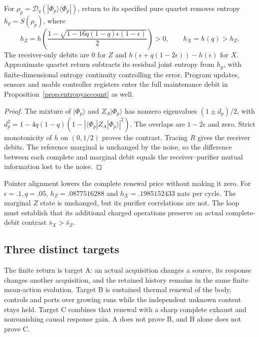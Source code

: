 \begin{proposition}
\label{prop:pointer-debit}
For $\rho_p=\mathcal D_q(|\Phi_p\rangle\langle\Phi_p|)$, return to its
specified pure quartet removes entropy $h_p=S(\rho_p)$, where
\begin{equation}\label{eq:pointer-debit}
 h_Z=h\left(\frac{1-\sqrt{1-16q(1-q)\epsilon(1-\epsilon)}}2\right)>0,
 \qquad h_X=h(q)>h_Z.
\end{equation}
The receiver-only debits are $0$ for $Z$ and
$h(\epsilon+q(1-2\epsilon))-h(\epsilon)$ for $X$.
Approximate quartet return subtracts its residual joint entropy from
$h_p$, with finite-dimensional entropy continuity controlling the error.
Program updates, sensors and usable controller registers enter the full
maintenance debit in Proposition~\ref{prop:entropyaccount} as well.
\end{proposition}
\begin{proof}
The mixture of $|\Phi_p\rangle$ and $Z_A|\Phi_p\rangle$ has nonzero
eigenvalues $(1\pm d_p)/2$, with
$d_p^2=1-4q(1-q)(1-|\langle\Phi_p|Z_A|\Phi_p\rangle|^2)$.
The overlaps are $1-2\epsilon$ and zero. Strict monotonicity of $h$ on
$(0,1/2)$ proves the contrast. Tracing $R$ gives the receiver debits.
The reference marginal is unchanged by the noise, so the difference
between each complete and marginal debit equals the receiver--purifier
mutual information lost to the noise.
\end{proof}

Pointer alignment lowers the complete renewal price without making it
zero. For $\epsilon=.1,q=.05$,
$h_Z=.0877516288$ and $h_X=.1985152433$ nats per cycle.
The marginal $Z$ state is unchanged, but its purifier correlations are not.
The loop must establish that its additional charged operations preserve
an actual complete-debit contrast $\bar s_X>\bar s_Z$.

\subsection{Three distinct targets}
\label{sec:sustainable}

The finite return is target A: an actual acquisition changes a source,
its response changes another acquisition, and the retained history
remains in the same finite mean-action evolution.
Target B is sustained thermal renewal of the body, controls and ports
over growing runs while the independent unknown content stays held.
Target C combines that renewal with a sharp complete exhaust and
nonvanishing causal response gain. A does not prove B, and B alone
does not prove C.

